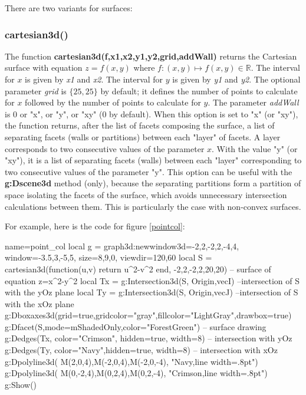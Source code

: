 There are two variants for surfaces:

\subsubsection{cartesian3d()}

The function \textbf{cartesian3d(f,x1,x2,y1,y2,grid,addWall)} returns the Cartesian surface with equation $z=f(x,y)$ where $f\colon(x,y)\mapsto f(x,y)\in\mathbb R$. The interval for $x$ is given by \emph{x1} and \emph{x2}. The interval for $y$ is given by \emph{y1} and \emph{y2}. The optional parameter \emph{grid} is $\{25,25\}$ by default; it defines the number of points to calculate for $x$ followed by the number of points to calculate for $y$. The parameter \emph{addWall} is 0 or "x", or "y", or "xy" (0 by default). When this option is set to "x" (or "xy"), the function returns, after the list of facets composing the surface, a list of separating facets (walls or partitions) between each "layer" of facets. A layer corresponds to two consecutive values ​​of the parameter $x$. With the value "y" (or "xy"), it is a list of separating facets (walls) between each "layer" corresponding to two consecutive values ​​of the parameter "y". This option can be useful with the \textbf{g:Dscene3d} method (only), because the separating partitions form a partition of space isolating the facets of the surface, which avoids unnecessary intersection calculations between them. This is particularly the case with non-convex surfaces.

For example, here is the code for figure \ref{pointcol}:
\begin{Luacode}
\begin{luadraw}{name=point_col}
local g = graph3d:new{window3d={-2,2,-2,2,-4,4}, window={-3.5,3,-5,5}, size={8,9,0}, viewdir={120,60}}
local S = cartesian3d(function(u,v) return u^2-v^2 end, -2,2,-2,2,{20,20}) -- surface of equation z=x^2-y^2
local Tx = g:Intersection3d(S, {Origin,vecI}) --intersection of S with the yOz plane
local Ty = g:Intersection3d(S, {Origin,vecJ}) --intersection of S with the xOz plane
g:Dboxaxes3d({grid=true,gridcolor="gray",fillcolor="LightGray",drawbox=true})
g:Dfacet(S,{mode=mShadedOnly,color="ForestGreen"}) -- surface drawing
g:Dedges(Tx, {color="Crimson", hidden=true, width=8}) -- intersection with yOz
g:Dedges(Ty, {color="Navy",hidden=true, width=8}) -- intersection with xOz
g:Dpolyline3d( {M(2,0,4),M(-2,0,4),M(-2,0,-4)}, "Navy,line width=.8pt")
g:Dpolyline3d( {M(0,-2,4),M(0,2,4),M(0,2,-4)}, "Crimson,line width=.8pt")
g:Show()
\end{luadraw}
\end{Luacode}

